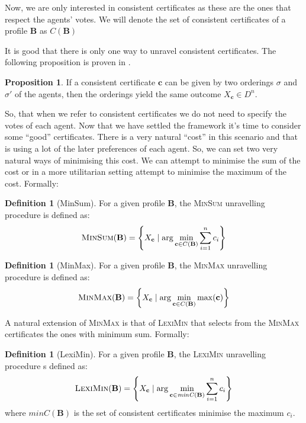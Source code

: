 \documentclass[11pt,a4paper, titlepage]{article}
\theoremstyle{definition}
\newtheorem{definition}[theorem]{Definition}
\newtheorem{proposition}[theorem]{Proposition}
\let\vec\mathbf
\begin{document}
Now, we are only interested in consistent certificates as these are the ones that respect the agents' votes. We will denote the set of consistent certificates of a profile $\mathbf{B}$ as $C(\mathbf{B})$

It is good that there is only one way to unravel consistent certificates. The following proposition is proven in .

\begin{proposition}
    If a consistent certificate $\mathbf{c}$ can be given by two orderings $\sigma$ and $\sigma'$ of the agents, then the orderings yield the same outcome $X_\mathbf{c} \in D^n$.
\end{proposition}

So, that when we refer to consistent certificates we do not need to specify the votes of each agent. Now that we have settled the framework it's time to consider some ``good'' certificates. There is a very natural ``cost'' in this scenario and that is using a lot of the later preferences of each agent. So, we can set two very natural ways of minimising this cost. We can attempt to minimise the sum of the cost or in a more utilitarian setting attempt to minimise the maximum of the cost. Formally:

\begin{definition}[MinSum]
    For a given profile $\mathbf{B}$, the \textsc{MinSum} unravelling procedure is defined as:
    \[
        \textsc{MinSum}(\mathbf{B}) = \left\{X_{\mathbf{c}} \mid \mathrm{arg} \min_{\mathbf{c} \in C(\mathbf{B})} \sum_{i=1}^n c_i \right\}
    \]
\end{definition}

\begin{definition}[MinMax]
    For a given profile $\mathbf{B}$, the \textsc{MinMax} unravelling procedure is defined as:
    \[
        \textsc{MinMax}(\mathbf{B}) = \left\{X_{\mathbf{c}} \mid \mathrm{arg} \min_{\mathbf{c} \in C(\mathbf{B})} \max (\mathbf{c}) \right\}
    \]
\end{definition}

A natural extension of \textsc{MinMax} is that of \textsc{LexiMin} that selects from the \textsc{MinMax} certificates the ones with minimum sum. Formally:

\begin{definition}[LexiMin]
    For a given profile $\mathbf{B}$, the \textsc{LexiMin} unravelling procedure s defined as:
    \[
        \textsc{LexiMin}(\mathbf{B}) =  \left\{ X_{\mathbf{c}}\mid \arg  \min_{\vec{c} \in \mathit{minC}(\mathbf{B})} \sum_{i=1}^n c_i \right\}
    \]
    where $\mathit{minC}(\vec{B})$ is the set of consistent certificates minimise the maximum $c_i$. 
\end{definition}
\end{document}
